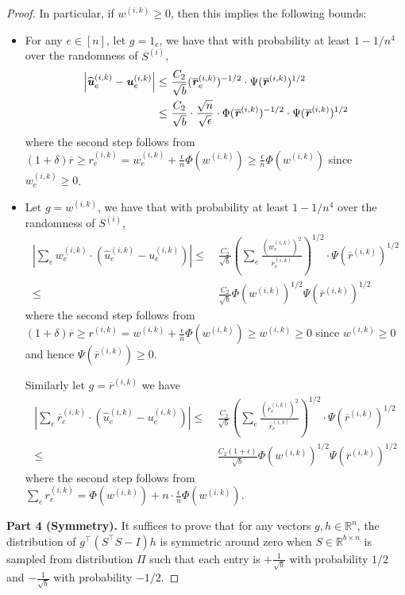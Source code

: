 \documentclass[11pt]{article}
\let\originalleft\left
\let\originalright\right
\renewcommand{\left}{\mathopen{}\mathclose\bgroup\originalleft}
\renewcommand{\right}{\aftergroup\egroup\originalright}
\renewcommand\gg{\boldsymbol{\mathit{g}}}
\newcommand\hh{\boldsymbol{\mathit{h}}}
\newcommand\rr{\boldsymbol{\mathit{r}}}
\newcommand\uu{\boldsymbol{\mathit{u}}}
\newcommand\ww{\boldsymbol{\mathit{w}}}
\newcommand\rrbar{\overline{\boldsymbol{\mathit{r}}}}
\renewcommand\SS{\boldsymbol{\mathit{S}}}
\newcommand{\wh}{\widehat}
\newcommand\R{\mathbb{R}}
\begin{document}
\begin{proof}
In particular, if $\ww^{(i,k)} \geq 0$, then this implies the following bounds:
\begin{itemize}
\item For any $e \in [n]$, let $\gg = 1_e$, we have that with probability at least $1 - 1/n^4$ over the randomness of $\SS^{(i)}$,
\begin{align*}
\left|\wh{\uu}^{(i,k)}_e - \uu^{(i,k)}_e \right| \leq &~ \frac{C_2}{\sqrt{b}} (\rrbar_e^{(i,k)})^{-1/2} \cdot \Psi(\rrbar^{(i,k)})^{1/2} \\
\leq &~ \frac{C_2}{\sqrt{b}} \cdot \frac{\sqrt{n}}{\sqrt{\epsilon}} \cdot \Phi(\rrbar^{(i,k)})^{-1/2} \cdot \Psi(\rrbar^{(i,k)})^{1/2} 
\end{align*}
where the second step follows from $(1+\delta)\rrbar\geq\rr_e^{(i,k)} = \ww_e^{(i,k)} + \frac{\epsilon}{n} \Phi(\ww^{(i,k)}) \geq \frac{\epsilon}{n} \Phi(\ww^{(i,k)})$ since $\ww_e^{(i,k)} \geq 0$. 
\item Let $\gg = \ww^{(i,k)}$, we have that with probability at least $1 - 1/n^4$ over the randomness of $\SS^{(i)}$,
\begin{align*}
| \sum_e \ww_e^{(i,k)} \cdot (\wh{\uu}^{(i,k)}_e - \uu^{(i,k)}_e)| \leq &~ \frac{C_2}{\sqrt{b}} (\sum_e \frac{(\ww_e^{(i,k)})^2}{\rrbar_e^{(i,k)}})^{1/2} \cdot \Psi(\rrbar^{(i,k)})^{1/2} \\
\leq &~ \frac{C_2}{\sqrt{b}} \Phi(\ww^{(i,k)})^{1/2} \Psi(\rrbar^{(i,k)})^{1/2}
\end{align*}
where the second step follows from $(1+\delta)\rrbar\geq\rr^{(i,k)} = \ww^{(i,k)} + \frac{\epsilon}{n} \Phi(\ww^{(i,k)}) \geq \ww^{(i,k)} \geq 0$ since $\ww^{(i,k)} \geq 0$ and hence $\Psi(\rrbar^{(i,k)}) \geq 0$.

Similarly let $\gg = \rrbar^{(i,k)}$ we have
\begin{align*}
| \sum_e \rrbar_e^{(i,k)} \cdot (\wh{\uu}^{(i,k)}_e - \uu^{(i,k)}_e)| \leq &~ \frac{C_2}{\sqrt{b}} (\sum_e \frac{(\rrbar_e^{(i,k)})^2}{\rrbar_e^{(i,k)}})^{1/2} \cdot \Psi(\rrbar^{(i,k)})^{1/2} \\
\leq &~ \frac{C_2 (1 + \epsilon)}{\sqrt{b}} \Phi(\ww^{(i,k)})^{1/2} \Psi(\rrbar^{(i,k)})^{1/2}
\end{align*}
where the second step follows from $\sum_e \rr_e^{(i,k)} = \Phi(\ww^{(i,k)}) + n \cdot \frac{\epsilon}{n} \Phi(\ww^{(i,k)})$.
\end{itemize}

{\bf Part 4 (Symmetry).} It suffices to prove that for any vectors $\gg, \hh\in \R^n$, the distribution of $\gg^{\top} (\SS^{\top} \SS - I) \hh$ is symmetric around zero when $\SS \in \R^{b \times n}$ is sampled from distribution $\Pi$ such that each entry is $+\frac{1}{\sqrt{b}}$ with probability $1/2$ and $-\frac{1}{\sqrt{b}}$ with probability $-1/2$.


\end{proof}
\end{document}

